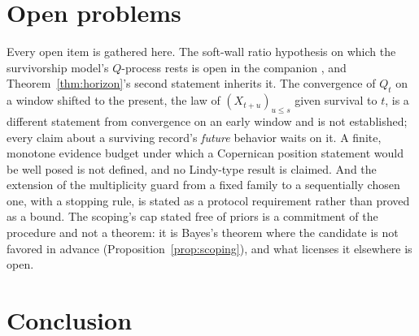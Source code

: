\section{Open problems}\label{sec:open}

Every open item is gathered here. The soft-wall ratio hypothesis on which
the survivorship model's $Q$-process rests is open in the companion
\cite{GoldenSurvivorship}, and Theorem~\ref{thm:horizon}'s second statement inherits
it. The convergence of $Q_t$ on a window shifted to the present, the law
of $(X_{t+u})_{u\le s}$ given survival to $t$, is a different statement
from convergence on an early window and is not established; every claim
about a surviving record's \emph{future} behavior waits on it. A finite,
monotone evidence budget under which a Copernican position statement
would be well posed is not defined, and no Lindy-type result is claimed.
And the extension of the multiplicity guard from a fixed family to a
sequentially chosen one, with a stopping rule, is stated as a protocol
requirement rather than proved as a bound. The scoping's cap stated free
of priors is a commitment of the procedure and not a theorem: it is
Bayes's theorem where the candidate is not favored in advance
(Proposition~\ref{prop:scoping}), and what licenses it elsewhere is
open.

\section{Conclusion}\label{sec:conclusion}

